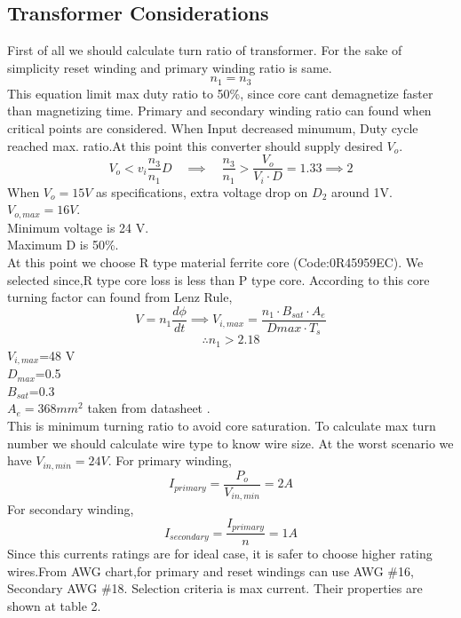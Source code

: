 \documentclass{article}
\begin{document}
\subsection{Transformer Considerations}
First of all we should calculate turn ratio of transformer. For the sake of simplicity reset winding and primary winding ratio is same.
\begin{equation}
    n_{1}=n_{3}
\end{equation}
This equation limit max duty ratio to 50\%, since core cant demagnetize faster than magnetizing time.
Primary and secondary winding ratio can found when critical points are considered. When Input decreased minumum, Duty cycle reached max. ratio.At this point this converter should supply desired $V_o$.
\begin{equation}
    V_o<v_i\frac{n_3}{n_1}D \quad \implies \quad \frac{n_3}{n_1}>\frac{V_o}{V_i\cdot D}=1.33 \implies 2
\end{equation}
When $V_o=15 V$ as specifications, extra voltage drop on $D_2$ around 1V. \\$V_{o,max}=16 V$.\\Minimum voltage is 24 V. \\Maximum D is 50\%.\\
At this point we choose R type material ferrite core (Code:0R45959EC). We selected since,R type core loss is less than P type core. According to this core turning factor can found from Lenz Rule,
\begin{equation}
    V=n_1\frac{d\phi}{dt} \implies V_{i,max}=\frac{n_1\cdot B_{sat}\cdot A_e}{D{max}\cdot T_s}
\end{equation}
\[\therefore n_1> 2.18\]
$V_{i,max}$=48 V\\
$D_{max}$=0.5\\
$B_{sat}$=0.3\\
$A_e= 368 mm^2$ taken from datasheet \cite{core}.\\
This is minimum turning ratio to avoid core saturation.
To calculate max turn number we should calculate wire type to know wire size.
At the worst scenario we have $V_{in,min}=24 V$. For primary winding,
\begin{equation}
    I_{primary}=\frac{P_o}{V_{in,min}}=2A
\end{equation}
For secondary winding,
\begin{equation}
    I_{secondary}=\frac{I_{primary}}{n}=1A
\end{equation}
Since this currents ratings are for ideal case, it is safer to choose higher rating wires.From AWG chart,for primary and reset windings can use AWG \#16, Secondary AWG \#18. Selection criteria is max current. Their properties are shown at table 2.
\end{document}
